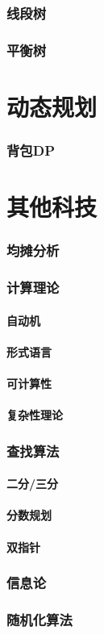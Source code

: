 \documentclass[12pt,a4paper]{article}
\begin{document}
\section{线段树}
\section{平衡树}

\newpage
\part{动态规划}
\section{背包DP} %

\newpage
\part{其他科技}
\section{均摊分析}
\section{计算理论}  %
\subsection{自动机}
\subsection{形式语言}
\subsection{可计算性}
\subsection{复杂性理论}
\section{查找算法}
\subsection{二分/三分}
\subsection{分数规划}
\subsection{双指针}
\section{信息论}
\section{随机化算法}
\end{document}
